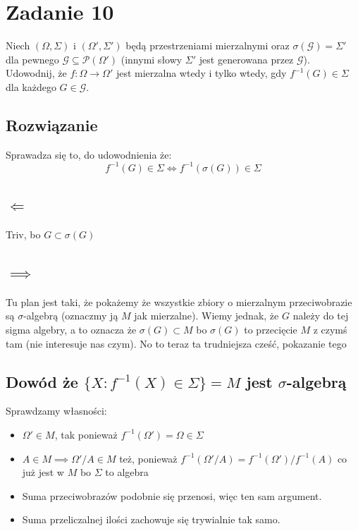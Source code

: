 \section{Zadanie 10}
Niech \((\Omega, \Sigma)\) i \((\Omega', \Sigma')\) będą przestrzeniami mierzalnymi oraz \(\sigma(\mathcal{G}) = \Sigma'\) dla pewnego \(\mathcal{G} \subseteq \mathcal{P}(\Omega')\) (innymi słowy \(\Sigma'\) jest generowana przez \(\mathcal{G}\)). Udowodnij, że \(f : \Omega \to \Omega'\) jest mierzalna wtedy i tylko wtedy, gdy \(f^{-1}(G) \in \Sigma\) dla każdego \(G \in \mathcal{G}\).

\subsection*{Rozwiązanie}
Sprawadza się to, do udowodnienia że:
\[f^{-1}(G) \in \Sigma \iff f^{-1}(\sigma(G)) \in \Sigma\]
\subsection{\(\Leftarrow\)}
Triv, bo \(G \subset \sigma(G)\)
\subsection{\(\implies\)}
Tu plan jest taki, że pokażemy że wszystkie zbiory o mierzalnym przeciwobrazie są \(\sigma\)-algebrą (oznaczmy ją \(M\) jak mierzalne). Wiemy jednak, że \(G\) należy do tej sigma algebry, a to oznacza że \(\sigma(G) \subset M\) bo \(\sigma(G)\) to przecięcie \(M\) z czymś tam (nie interesuje nas czym). No to teraz ta trudniejsza cześć, pokazanie tego
\subsection{Dowód że \(\{X: f^{-1}(X) \in \Sigma\} = M\) jest \(\sigma\)-algebrą}
Sprawdzamy własności:
\begin{itemize}
	\item \(\Omega' \in M\), tak ponieważ \(f^{-1}(\Omega') = \Omega \in \Sigma\)
	\item \(A \in M \implies \Omega'/A \in M\) też, ponieważ \(f^{-1}(\Omega'/A) = f^{-1}(\Omega')/f^{-1}(A)\) co już jest w \(M\) bo \(\Sigma\) to algebra
	\item Suma przeciwobrazów podobnie się przenosi, więc ten sam argument.
	\item Suma przeliczalnej ilości zachowuje się trywialnie tak samo.
\end{itemize}
